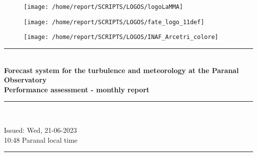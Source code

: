 \documentclass[11pt,english]{article}
\newcommand{\HRule}{\rule{\linewidth}{0.5mm}}
\begin{document}
\begin{figure}
\begin{center}
\hspace{1.5cm}
\parbox{5.5cm}{\texttt{[image: /home/report/SCRIPTS/LOGOS/logoLaMMA]}}
\hspace{.3cm}
\parbox{5.5cm}{\texttt{[image: /home/report/SCRIPTS/LOGOS/fate\_logo\_11def]}}
\hspace{.3cm}
\parbox{5.5cm}{\texttt{[image: /home/report/SCRIPTS/LOGOS/INAF\_Arcetri\_colore]}}
\hspace{.1cm}
\vspace{1.2cm}
\end{center}
\end{figure}

\begin{center}
\HRule \\[0.4cm]
\Huge{\textbf{Forecast system for the turbulence and meteorology at the Paranal Observatory}}
\\[0.4cm]
\LARGE{\textbf{Performance assessment - monthly report}}
\HRule \\[0.4cm]
\end{center}

\begin{center}
\vspace{2cm}\Huge{Issued: Wed, 21-06-2023\\ 10:48 Paranal local time}
\HRule \\[0.1cm]
\end{center}

\clearpage
\end{document}
